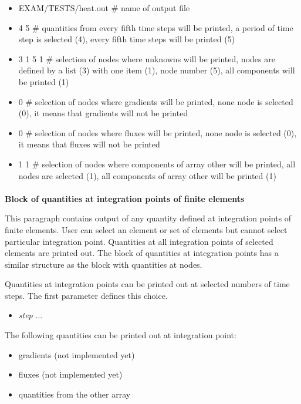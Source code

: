 \begin{itemize}
\item[]
EXAM/TESTS/heat.out \# name of output file
\item[]
4 5 \# quantities from every fifth time steps will be printed, a period of time step is selected (4), 
every fifth time steps will be printed (5)
\item[]
3 1 5 1 \# selection of nodes where unknowns will be printed, nodes
are defined by a list (3) with one item (1), node number (5),
all components will be printed (1)
\item[]
0 \# selection of nodes where gradients will be printed, none node is selected (0), it means that gradients
will not be printed
\item[]
0 \# selection of nodes where fluxes will be printed, none node is selected (0), it means that fluxes
will not be printed
\item[]
1 1 \# selection of nodes where components of array other will be printed, all nodes
are selected (1), all components of array other will be printed (1)
\end{itemize}

\paragraph{}{\bf Block of quantities at integration points of finite elements}

This paragraph contains output of any quantity defined at integration points of finite elements.
User can select an element or set of elements but cannot select particular integration point.
Quantities at all integration points of selected elements are printed out.
The block of quantities at integration points has a similar structure as the block with quantities at nodes.

Quantities at integration points can be printed out at selected numbers of time steps. The first parameter defines this choice.
\begin{itemize}
\item[] {\it step}  ... 
\end{itemize}

The following quantities can be printed out at integration point:
\begin{itemize}
\item gradients (not implemented yet)
\item fluxes (not implemented yet)
\item quantities from the other array
\end{itemize}

